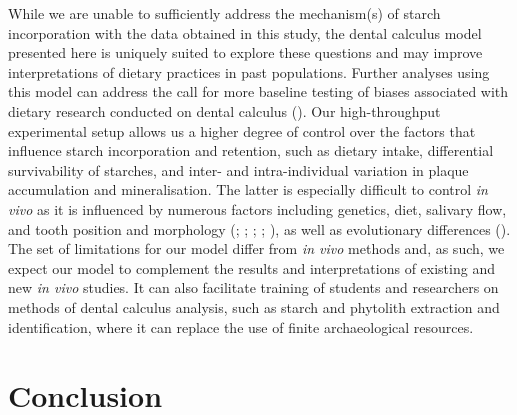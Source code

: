 \documentclass[
  b5paper,
]{book}
\begin{document}
While we are unable to sufficiently address the mechanism(s) of starch
incorporation with the data obtained in this study, the dental calculus
model presented here is uniquely suited to explore these questions and
may improve interpretations of dietary practices in past populations.
Further analyses using this model can address the call for more baseline
testing of biases associated with dietary research conducted on dental
calculus (). Our high-throughput experimental setup allows us a
higher degree of control over the factors that influence starch
incorporation and retention, such as dietary intake, differential
survivability of starches, and inter- and intra-individual variation in
plaque accumulation and mineralisation. The latter is especially
difficult to control \emph{in vivo} as it is influenced by numerous
factors including genetics, diet, salivary flow, and tooth position and
morphology (; ; ;
;
), as
well as evolutionary differences
().
The set of limitations for our model differ from \emph{in vivo} methods
and, as such, we expect our model to complement the results and
interpretations of existing and new \emph{in vivo} studies. It can also
facilitate training of students and researchers on methods of dental
calculus analysis, such as starch and phytolith extraction and
identification, where it can replace the use of finite archaeological
resources.

\section{Conclusion}\label{conclusion}
\end{document}
